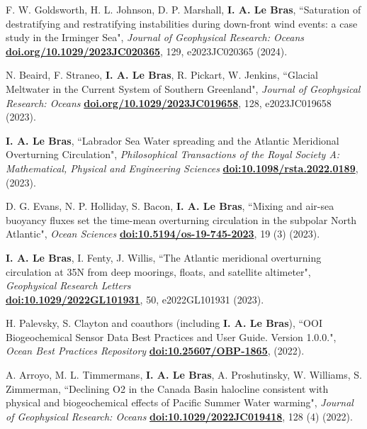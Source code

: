 \documentclass[paper=letter,fontsize=11pt]{scrartcl} %
\newcommand{\PaperEntry}[6]{
		\noindent #1, ``#2", \textit{#3} \textbf{#4}, #5 (#6).}
\begin{document}


\begin{etaremune}

\item \PaperEntry{F. W. Goldsworth, H. L. Johnson, D. P. Marshall, \textbf{I. A. Le Bras}}{Saturation of destratifying and restratifying instabilities during down-front wind events: a case study in the Irminger Sea}{Journal of Geophysical Research: Oceans}{\url{doi.org/10.1029/2023JC020365}}{129, e2023JC020365}{2024} 

\item \PaperEntry{N. Beaird, F. Straneo, \textbf{I. A. Le Bras}, R. Pickart, W. Jenkins}{Glacial Meltwater in the Current System of Southern Greenland}{Journal of Geophysical Research: Oceans}{\url{doi.org/10.1029/2023JC019658}}{128, e2023JC019658}{2023}

\item \PaperEntry{\textbf{I. A. Le Bras}}{Labrador Sea Water spreading and the Atlantic Meridional Overturning Circulation}{Philosophical Transactions of the Royal Society A: Mathematical, Physical and Engineering Sciences}{\url{doi:10.1098/rsta.2022.0189}}{}{2023}

\item \PaperEntry{D. G. Evans, N. P. Holliday, S. Bacon, \textbf{I. A. Le Bras}}{Mixing and air-sea buoyancy fluxes set the time-mean overturning circulation in the subpolar North Atlantic}{Ocean Sciences}{\url{doi:10.5194/os-19-745-2023}}{19 (3)}{2023}

\item \PaperEntry{\textbf{I. A. Le Bras}, I. Fenty, J. Willis}{The Atlantic meridional overturning circulation at 35N from deep moorings, floats, and satellite altimeter}{Geophysical Research Letters\\}{\url{doi:10.1029/2022GL101931}}{50, e2022GL101931}{2023}

\item \PaperEntry{H. Palevsky, S. Clayton and coauthors (including \textbf{I. A. Le Bras})}{OOI Biogeochemical Sensor Data Best Practices and User Guide. Version 1.0.0.}{Ocean Best Practices Repository}{\url{doi:10.25607/OBP-1865}}{}{2022}

\item \PaperEntry{A. Arroyo, M. L. Timmermans, \textbf{I. A. Le Bras}, A. Proshutinsky, W. Williams, S. Zimmerman}{Declining O2 in the Canada Basin halocline consistent with physical and biogeochemical effects of Pacific Summer Water warming}{Journal of Geophysical Research: Oceans}{\url{doi:10.1029/2022JC019418}}{128 (4)}{2022}


\end{etaremune}
\end{document}
